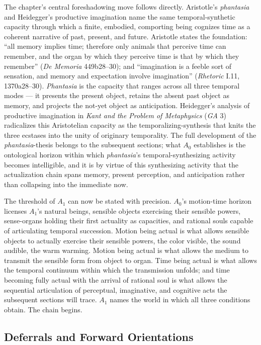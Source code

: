 The chapter's central foreshadowing move follows directly. Aristotle's \textit{phantasia} and Heidegger's productive imagination name the same temporal-synthetic capacity through which a finite, embodied, comporting being cognizes time as a coherent narrative of past, present, and future. Aristotle states the foundation: ``all memory implies time; therefore only animals that perceive time can remember, and the organ by which they perceive time is that by which they remember'' (\textit{De Memoria} 449b28--30); and ``imagination is a feeble sort of sensation, and memory and expectation involve imagination'' (\textit{Rhetoric} I.11, 1370a28--30). \textit{Phantasia} is the capacity that ranges across all three temporal modes --- it presents the present object, retains the absent past object as memory, and projects the not-yet object as anticipation. Heidegger's analysis of productive imagination in \textit{Kant and the Problem of Metaphysics} (\textit{GA} 3) radicalizes this Aristotelian capacity as the temporalizing-synthesis that knits the three ecstases into the unity of originary temporality. The full development of the \textit{phantasia}-thesis belongs to the subsequent sections; what $A_0$ establishes is the ontological horizon within which \textit{phantasia}'s temporal-synthesizing activity becomes intelligible, and it is by virtue of this synthesizing activity that the actualization chain spans memory, present perception, and anticipation rather than collapsing into the immediate now.

The threshold of $A_1$ can now be stated with precision. $A_0$'s motion-time horizon licenses $A_1$'s natural beings, sensible objects exercising their sensible powers, sense-organs holding their first actuality as capacities, and rational souls capable of articulating temporal succession. Motion being actual is what allows sensible objects to actually exercise their sensible powers, the color visible, the sound audible, the warm warming. Motion being actual is what allows the medium to transmit the sensible form from object to organ. Time being actual is what allows the temporal continuum within which the transmission unfolds; and time becoming fully actual with the arrival of rational soul is what allows the sequential articulation of perceptual, imaginative, and cognitive acts the subsequent sections will trace. $A_1$ names the world in which all three conditions obtain. The chain begins.

\subsection*{Deferrals and Forward Orientations}

